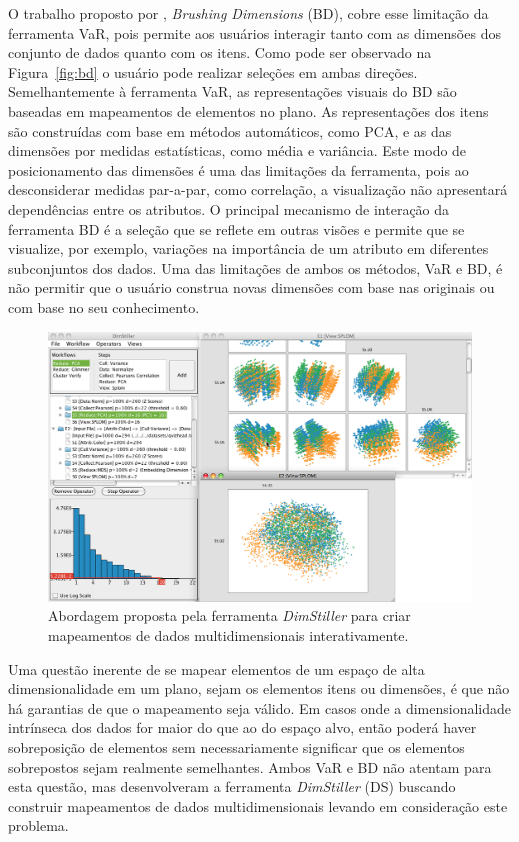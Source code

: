 O trabalho proposto por \citet{Turkay2011}, \emph{Brushing
Dimensions} (BD), cobre esse limitação da ferramenta
VaR, pois permite aos usuários interagir tanto com as
dimensões dos conjunto de dados quanto com os itens.  Como
pode ser observado na Figura~\ref{fig:bd} o usuário pode
realizar seleções em ambas direções. Semelhantemente à
ferramenta VaR, as representações visuais do BD são baseadas
em mapeamentos de elementos no plano. As representações dos
itens são construídas com base em métodos automáticos, como
PCA, e as das dimensões por medidas estatísticas, como média
e variância. Este modo de posicionamento das dimensões é uma
das limitações da ferramenta, pois ao desconsiderar medidas
par-a-par, como correlação, a visualização não apresentará
dependências entre os atributos. O principal mecanismo de
interação da ferramenta BD é a seleção que se reflete em
outras visões e permite que se visualize, por exemplo,
variações na importância de um atributo em diferentes
subconjuntos dos dados. Uma das limitações de ambos os
métodos, VaR e BD, é não permitir que o usuário construa
novas dimensões com base nas originais ou com base no seu
conhecimento.

\begin{figure}[h!]
    \centering
    \includegraphics[width=16cm]{images/ds.png}
    \caption[DimStiller]
    {Abordagem proposta pela ferramenta \emph{DimStiller}
    para criar mapeamentos de dados multidimensionais
    interativamente.}
    \label{fig:ds}
\end{figure}

Uma questão inerente de se mapear elementos de um espaço de
alta dimensionalidade em um plano, sejam os elementos itens
ou dimensões, é que não há garantias de que o mapeamento
seja válido. Em casos onde a dimensionalidade intrínseca dos
dados for maior do que ao do espaço alvo, então poderá haver
sobreposição de elementos sem necessariamente significar que
os elementos sobrepostos sejam realmente semelhantes. Ambos
VaR e BD não atentam para esta questão, mas
\citet{Ingram2010} desenvolveram a ferramenta
\emph{DimStiller} (DS) buscando construir mapeamentos de
dados multidimensionais levando em consideração este
problema. 

